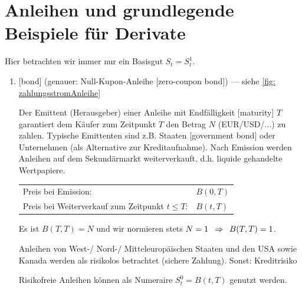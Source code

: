 \section{Anleihen und grundlegende Beispiele für Derivate}

Hier betrachten wir immer nur ein Basisgut $S_t = S_t^1$.

\begin{enumerate}[leftmargin=*, label=(\alph*)]
	\item {} [bond] (genauer: Null-Kupon-Anleihe [zero-coupon bond]) --- siehe \cref{fig: zahlungsstromAnleihe}
	
	Der Emittent (Herausgeber) einer Anleihe mit Endfälligkeit [maturity] $T$ garantiert dem Käufer zum Zeitpunkt $T$ den Betrag $N$ (EUR/USD/...) zu zahlen.
	Typische Emittenten sind z.B. Staaten [government bond] oder Unternehmen (als Alternative zur Kreditaufnahme).
	Nach Emission werden Anleihen auf dem Sekundärmarkt weiterverkauft, d.h. liquide gehandelte Wertpapiere. 
	
	\begin{tabular}{ll}
		Preis bei Emission: & $B(0,T)$ \\
		Preis bei Weiterverkauf zum Zeitpunkt $t \le T$: & $B(t,T)$ \\
	\end{tabular}
	
	Es ist $B(T,T) = N$ und wir normieren stets $N=1 \enskip \Rightarrow \enskip B(T,T)=1$.
	
	Anleihen von West-/ Nord-/ Mitteleuropäischen Staaten und den USA sowie Kanada werden als risikolos betrachtet (sichere Zahlung). Sonst: Kreditrisiko
	
	Risikofreie Anleihen können als Numeraire $S_t^0 = B(t,T)$ genutzt werden.
	

\end{enumerate}
